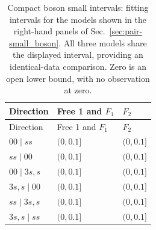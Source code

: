\begingroup\setlength{\tabcolsep}{2pt}
\begin{longtable}{lll}
\caption{Compact boson small intervals: fitting intervals for the models shown in the right-hand panels of Sec.~\ref{sec:pair-small_boson}. All three models share the displayed interval, providing an identical-data comparison. Zero is an open lower bound, with no observation at zero.}
\label{tab:window-small_boson-ranges}\\\toprule
Direction & Free 1 and $F_1$ & $F_2$\\\midrule
\endfirsthead
\toprule
Direction & Free 1 and $F_1$ & $F_2$\\\midrule
\endhead
\bottomrule\endfoot
$00\mid ss$ & $(0,0.1]$ & $(0,0.1]$\\
$ss\mid 00$ & $(0,0.1]$ & $(0,0.1]$\\
$00\mid 3s,s$ & $(0,0.1]$ & $(0,0.1]$\\
$3s,s\mid 00$ & $(0,0.1]$ & $(0,0.1]$\\
$ss\mid 3s,s$ & $(0,0.1]$ & $(0,0.1]$\\
$3s,s\mid ss$ & $(0,0.1]$ & $(0,0.1]$\\
\end{longtable}
\endgroup
